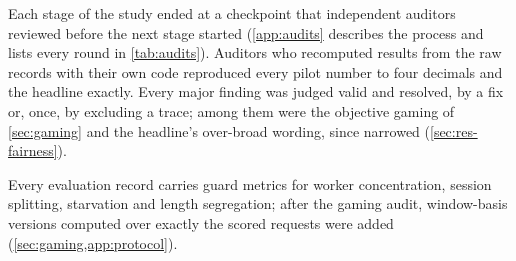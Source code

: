 Each stage of the study ended at a checkpoint that independent auditors reviewed before the next
stage started (\cref{app:audits} describes the process and lists every round in \cref{tab:audits}).
Auditors who recomputed results from the raw records with their own code reproduced every pilot
number to four decimals and the headline exactly. Every major finding was judged valid and
resolved, by a fix or, once, by excluding a trace; among them were the objective gaming of
\cref{sec:gaming} and the headline's over-broad wording, since narrowed (\cref{sec:res-fairness}).

Every evaluation record carries guard metrics for worker concentration, session splitting,
starvation and length segregation; after the gaming audit, window-basis versions computed over
exactly the scored requests were added (\cref{sec:gaming,app:protocol}).
